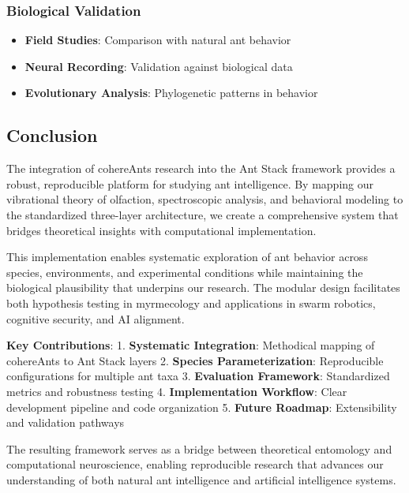 \documentclass[
  13pt,
  a4paperpaper,
  12pt]{article}
\providecommand{\tightlist}{%
  \setlength{\itemsep}{0pt}\setlength{\parskip}{0pt}}
\begin{document}
\subsubsection{Biological Validation}\label{biological-validation}

\begin{itemize}
\tightlist
\item
  \textbf{Field Studies}: Comparison with natural ant behavior
\item
  \textbf{Neural Recording}: Validation against biological data
\item
  \textbf{Evolutionary Analysis}: Phylogenetic patterns in behavior
\end{itemize}

\subsection{Conclusion}\label{conclusion}

The integration of cohereAnts research into the Ant Stack framework
provides a robust, reproducible platform for studying ant intelligence.
By mapping our vibrational theory of olfaction, spectroscopic analysis,
and behavioral modeling to the standardized three-layer architecture, we
create a comprehensive system that bridges theoretical insights with
computational implementation.

This implementation enables systematic exploration of ant behavior
across species, environments, and experimental conditions while
maintaining the biological plausibility that underpins our research. The
modular design facilitates both hypothesis testing in myrmecology and
applications in swarm robotics, cognitive security, and AI alignment.

\textbf{Key Contributions}: 1. \textbf{Systematic Integration}:
Methodical mapping of cohereAnts to Ant Stack layers 2. \textbf{Species
Parameterization}: Reproducible configurations for multiple ant taxa 3.
\textbf{Evaluation Framework}: Standardized metrics and robustness
testing 4. \textbf{Implementation Workflow}: Clear development pipeline
and code organization 5. \textbf{Future Roadmap}: Extensibility and
validation pathways

The resulting framework serves as a bridge between theoretical
entomology and computational neuroscience, enabling reproducible
research that advances our understanding of both natural ant
intelligence and artificial intelligence systems.
\end{document}
